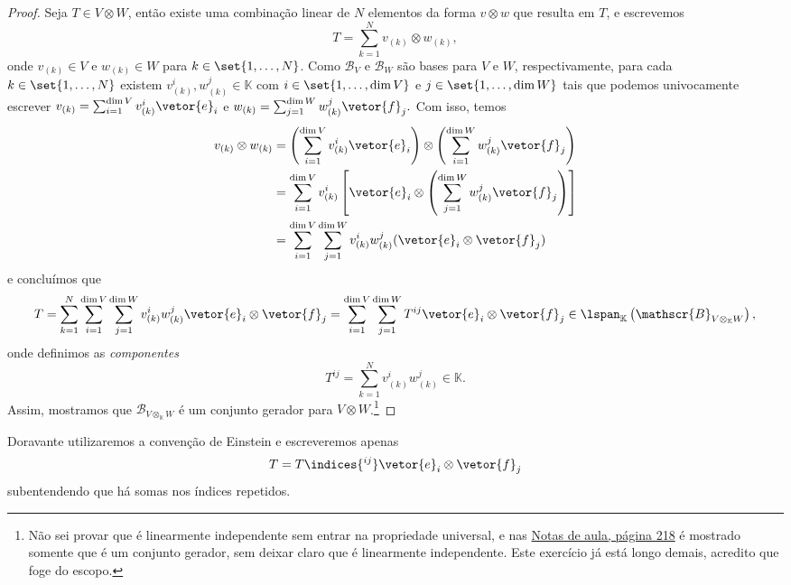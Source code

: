\begin{proof}
    Seja \(T \in V \otimes W\), então existe uma combinação linear de \(N\) elementos da forma \(v \otimes w\) que resulta em \(T\), e escrevemos
    \begin{equation*}
        T = \sum_{k = 1}^N v_{(k)} \otimes w_{(k)},
    \end{equation*}
    onde \(v_{(k)} \in V\) e \(w_{(k)} \in W\) para \(k \in \set{1, \dots, N}\). Como \(\mathscr{B}_V\) e \(\mathscr{B}_W\) são bases para \(V\) e \(W\), respectivamente, para cada \(k \in \set{1, \dots, N}\) existem \(v_{(k)}^i, w_{(k)}^j \in \mathbb{K}\) com \(i \in \set{1, \dots, \dim V}\) e \(j \in \set{1, \dots, \dim W}\) tais que podemos univocamente escrever \(v_{(k)} = \sum_{i = 1}^{\dim V} v_{(k)}^i \vetor{e}_i\) e \(w_{(k)} = \sum_{j = 1}^{\dim W} w_{(k)}^j \vetor{f}_j.\)
    Com isso, temos
    \begin{align*}
        v_{(k)}\otimes w_{(k)} &= \left(\sum_{i = 1}^{\dim V} v_{(k)}^i\vetor{e}_i\right) \otimes \left(\sum_{i = 1}^{\dim W} w_{(k)}^j \vetor{f}_j\right)\\
                               &= \sum_{i = 1}^{\dim V} v_{(k)}^i \left[\vetor{e}_i \otimes \left(\sum_{j = 1}^{\dim W} w_{(k)}^j \vetor{f}_j\right)\right]\\
                               &= \sum_{i = 1}^{\dim V} \sum_{j = 1}^{\dim W} v_{(k)}^i w_{(k)}^j (\vetor{e}_i \otimes \vetor{f}_j)
    \end{align*}
    e concluímos que
    \begin{equation*}
        T = \sum_{k = 1}^N \sum_{i = 1}^{\dim V} \sum_{j = 1}^{\dim W} v_{(k)}^{i} w_{(k)}^{j} \vetor{e}_i \otimes \vetor{f}_j = \sum_{i = 1}^{\dim V} \sum_{j = 1}^{\dim W} T^{ij} \vetor{e}_i \otimes \vetor{f}_j \in \lspan_{\mathbb{K}}\left(\mathscr{B}_{V \otimes_{\mathbb{K}} W}\right),
    \end{equation*}
    onde definimos as \emph{componentes}
    \begin{equation*}
        T^{ij} = \sum_{k = 1}^N v_{(k)}^i w_{(k)}^j \in \mathbb{K}.
    \end{equation*}
    Assim, mostramos que \(\mathscr{B}_{V \otimes_{\mathbb{K}}W}\) é um conjunto gerador para \(V \otimes W\).\footnote{Não sei provar que é linearmente independente sem entrar na propriedade universal, e nas \href{http://denebola.if.usp.br/~jbarata/Notas_de_aula/arquivos/nc-cap02.pdf}{Notas de aula, página 218} é mostrado somente que é um conjunto gerador, sem deixar claro que é linearmente independente. Este exercício já está longo demais, acredito que foge do escopo.}
\end{proof}
\begin{remark}
    Doravante utilizaremos a convenção de Einstein e escreveremos apenas
    \begin{equation*}
        T = T\indices{^{ij}} \vetor{e}_i \otimes \vetor{f}_j
    \end{equation*}
    subentendendo que há somas nos índices repetidos.
\end{remark}

